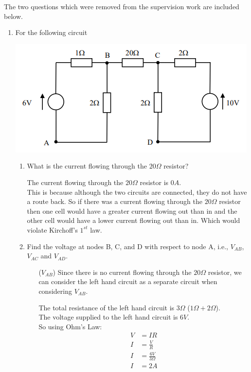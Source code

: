 \documentclass[10pt,\jkfside,a4paper]{article}
\begin{document}
\vspace{1cm}

The two questions which were removed from the supervision work are included below.

\vspace{1cm}

\begin{enumerate}

\item{For the following circuit}

\begin{center}
\includegraphics{2.22}
\end{center}

\begin{enumerate}

\item{What is the current flowing through the $20\Omega$ resistor?}

The current flowing through the $20\Omega$ resistor is $0A$.\\
This is because although the two circuits are connected, they do not have 
a route back. So if there was a current flowing through the $20\Omega$ 
resistor then one cell would have a greater current flowing 
out than in and the other cell would have a lower current flowing out 
than in. Which would violate Kirchoff’s $1^{st}$ law.

\item{Find the voltage at nodes B, C, and D with respect to node A, i.e., 
$V_{AB}$, $V_{AC}$ and $V_{AD}$.}

\begin{enumerate}
\item[($V_{AB}$)] Since there is no current flowing through the $20\Omega$ resistor, we can 
consider the left hand circuit as a separate circuit when considering $V_{AB}$.

The total resistance of the left hand circuit is $3\Omega$ ($1\Omega + 2\Omega$).\\
The voltage supplied to the left hand circuit is $6V$.\\
So using Ohm's Law:
\begin{equation}
\begin{split}
V &= IR\\
I &= \frac{V}{R}\\
I &= \frac{6V}{3\Omega}\\
I &= 2A\\
\end{split}
\end{equation}


\end{enumerate}
\end{enumerate}
\end{enumerate}
\end{document}
